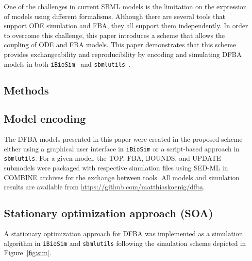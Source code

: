 \documentclass{bioinfo}
\begin{document}
One of the challenges in current SBML models is the limitation on the expression of models using different formalisms. Although there are several tools that support ODE simulation and FBA, they all support them independently. In order to overcome this challenge, this paper introduces a scheme that allows the coupling of ODE and FBA models.  This paper demonstrates that this scheme provides exchangeability and reproducibility by encoding and simulating DFBA models in both \texttt{iBioSim}~\citep{BIOSIM} and \texttt{sbmlutils}~\citep{sbmlutils}.



\begin{methods}
\section{Methods}
\subsection{Model encoding}
The DFBA models presented in this paper were created in the proposed scheme either using a graphical user interface in \texttt{iBioSim} or a script-based approach in \texttt{sbmlutils}. For a given model, the TOP, FBA, BOUNDS, and UPDATE submodels were packaged with respective simulation files using SED-ML in COMBINE archives for the exchange between tools. All models and simulation results are available from
\href{https://github.com/matthiaskoenig/dfba}{https://github.com/matthiaskoenig/dfba}.

\subsection{Stationary optimization approach (SOA)}
A stationary optimization approach for DFBA was implemented as a simulation algorithm in \texttt{iBioSim} and \texttt{sbmlutils} following the simulation scheme depicted in Figure~\ref{fig:sim}. 


\end{methods}
\end{document}
